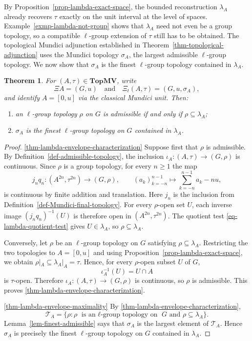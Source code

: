 \documentclass[preprint,3p]{elsarticle}
\theoremstyle{plain}
\newtheorem{thm}{Theorem}[section]
\theoremstyle{definition}
\newcommand{\TopMV}{\mathbf{TopMV}}
\numberwithin{equation}{section}
\begin{document}
By Proposition~\ref{prop-lambda-exact-space}, the bounded reconstruction
$\lambda_A$ already recovers $\tau$ exactly on the unit interval at the
level of spaces.  Example~\ref{exmp-lambda-not-group} shows that
$\lambda_A$ need not even be a group topology, so a compatible
$\ell$-group extension of $\tau$ still has to be obtained.  The topological Mundici adjunction established in
Theorem~\ref{thm-topological-adjunction} uses the Mundici topology
$\sigma_A$, the largest admissible $\ell$-group topology.
We now show that $\sigma_A$ is the finest $\ell$-group topology
contained in $\lambda_A$.

\begin{thm}
\label{thm-lambda-envelope}
For $(A,\tau)\in\TopMV$, write
\[
 \Xi A=(G,u)
 \quad\text{and}\quad
 \Xi_t(A,\tau)=(G,u,\sigma_A),
\]
and identify $A=[0,u]$ via the classical Mundici unit.
Then:
\begin{enumerate}[label=(\alph*),ref=(\alph*)]
\item\label{thm-lambda-envelope-characterization}
an $\ell$-group topology $\rho$ on $G$ is admissible if and only if $\rho\subseteq\lambda_A$;
\item\label{thm-lambda-envelope-maximality}
$\sigma_A$ is the finest $\ell$-group topology on $G$ contained in
$\lambda_A$.
\end{enumerate}
\end{thm}

\begin{proof}
\ref{thm-lambda-envelope-characterization}
Suppose first that $\rho$ is admissible.  By
Definition~\ref{def-admissible-topology}, the inclusion
$\iota_A\colon(A,\tau)\longrightarrow(G,\rho)$ is continuous.
Since $\rho$ is a group topology, for every $n\geq1$ the map
\[
 j_nq_n\colon(A^{2n},\tau^{2n})\longrightarrow(G,\rho),
 \qquad
 (a_k)_{k=-n}^{n-1}\mapsto\sum_{k=-n}^{n-1}a_k-nu,
\]
is continuous by finite addition and translation.
Here $j_n$ is the inclusion from
Definition~\ref{def-Mundici-final-topology}.
For every $\rho$-open set $U$, each inverse image
$(j_nq_n)^{-1}(U)$ is therefore open in $(A^{2n},\tau^{2n})$.
The quotient test \eqref{eq-lambda-quotient-test} gives
$U\in\lambda_A$, so $\rho\subseteq\lambda_A$.

Conversely, let $\rho$ be an $\ell$-group topology on $G$ satisfying
$\rho\subseteq\lambda_A$.  Restricting the two topologies to
$A=[0,u]$ and using Proposition~\ref{prop-lambda-exact-space}, we obtain 
$\rho|_A\subseteq\lambda_A|_A=\tau$. 
Hence, for every $\rho$-open subset $U$ of $G$,
\[
 \iota_A^{-1}(U)=U\cap A
\]
is $\tau$-open.  Therefore $\iota_A\colon(A,\tau)\longrightarrow(G,\rho)$ 
is continuous, so $\rho$ is admissible.  This proves
\ref{thm-lambda-envelope-characterization}.

\ref{thm-lambda-envelope-maximality}
By \ref{thm-lambda-envelope-characterization},
\[
 \mathcal T_A
 =
 \{\rho:
   \rho\text{ is an $\ell$-group topology on }G
   \text{ and }\rho\subseteq\lambda_A\}.
\]
Lemma~\ref{lem-finest-admissible} says that $\sigma_A$ is the largest
element of $\mathcal T_A$.  Hence $\sigma_A$ is precisely the finest
$\ell$-group topology on $G$ contained in $\lambda_A$.
\end{proof}
\end{document}

